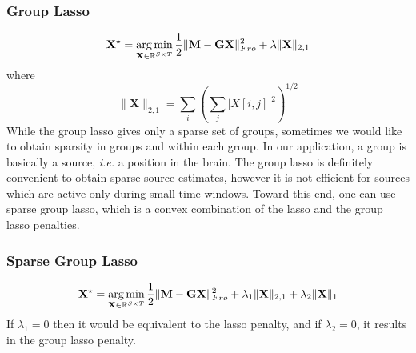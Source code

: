 \subsubsection*{Group Lasso}
\vspace{-10pt}
\begin{equation} \label{eq_glasso}
	\mathbf{X}^\star = \mathop{\mathrm{arg}\,\mathrm{min}}_{\mathbf{X}\in\mathbb{R}^{S\times T}}\frac{1}{2}\|\mathbf{M}-\mathbf{GX}\|_{Fro}^2 + \lambda\|\mathbf{X}\|_{2,1}
\end{equation}
where
\begin{equation*}	\|\mathbf{X}\|_{2,1}=\sum_i\left(\sum_j|X[i,j]|^2\right)^{1/2}
\end{equation*}
\endadjustwidth
While the group lasso gives only a sparse set of groups, sometimes we would like to obtain sparsity in groups and within each group. In our application, a group is basically a source, \textit{i.e.} a position in the brain. The group lasso is definitely convenient to obtain sparse source estimates, however it is not efficient for sources which are active only during small time windows. Toward this end, one can use sparse group lasso, which is a convex combination of the lasso and the group lasso penalties.
\adjustwidth{1em}{0pt}

\subsubsection*{Sparse Group Lasso}
\begin{equation} \label{eq_sglasso}
	\mathbf{X}^\star = \mathop{\mathrm{arg}\,\mathrm{min}}_{\mathbf{X}\in\mathbb{R}^{S\times T}}\frac{1}{2}\|\mathbf{M}-\mathbf{GX}\|_{Fro}^2 + \lambda_1\|\mathbf{X}\|_{2,1} + \lambda_2\|\mathbf{X}\|_1
\end{equation}
If $\lambda_1=0$ then it would be equivalent to the lasso penalty, and if $\lambda_2=0$, it results in the group lasso penalty.
\endadjustwidth

